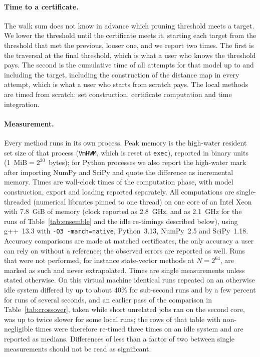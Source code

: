 \documentclass[aps,pra,superscriptaddress,floatfix,longbibliography,twocolumn]{revtex4-2}
\begin{document}
\paragraph*{Time to a certificate.} The walk sum does not know in advance which pruning threshold meets a target. We lower the threshold until the certificate meets it, starting each target from the threshold that met the previous, looser one, and we report two times. The first is the traversal at the final threshold, which is what a user who knows the threshold pays. The second is the cumulative time of all attempts for that model up to and including the target, including the construction of the distance map in every attempt, which is what a user who starts from scratch pays. The local methods are timed from scratch: set construction, certificate computation and time integration.

\paragraph*{Measurement.} Every method runs in its own process. Peak memory is the high-water resident set size of that process (\texttt{VmHWM}, which is reset at \texttt{exec}), reported in binary units (1~MiB${}=2^{20}$~bytes); for Python processes we also report the high-water mark after importing NumPy and SciPy and quote the difference as incremental memory. Times are wall-clock times of the computation phase, with model construction, export and loading reported separately. All computations are single-threaded (numerical libraries pinned to one thread) on one core of an Intel Xeon with 7.8~GiB of memory (clock reported as 2.8~GHz, and as 2.1~GHz for the runs of Table~\ref{tab:ensemble} and the idle re-timings described below), using g++~13.3 with \texttt{-O3 -march=native}, Python~3.13, NumPy~2.5 and SciPy~1.18. Accuracy comparisons are made at matched certificates, the only accuracy a user can rely on without a reference; the observed errors are reported as well. Runs that were not performed, for instance state-vector methods at $N=2^{64}$, are marked as such and never extrapolated. Times are single measurements unless stated otherwise. On this virtual machine identical runs repeated on an otherwise idle system differed by up to about 40\% for sub-second runs and by a few percent for runs of several seconds, and an earlier pass of the comparison in Table~\ref{tab:crossover}, taken while short unrelated jobs ran on the second core, was up to twice slower for some local runs; the rows of that table with non-negligible times were therefore re-timed three times on an idle system and are reported as medians. Differences of less than a factor of two between single measurements should not be read as significant.
\end{document}
